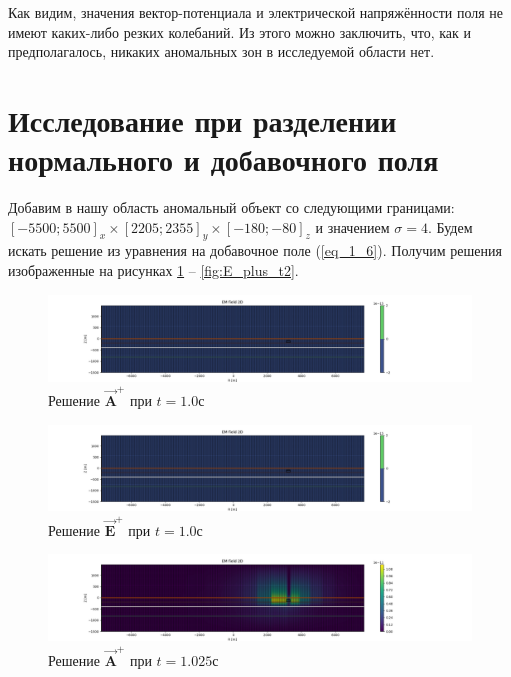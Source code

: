 Как видим, значения вектор-потенциала и электрической напряжённости поля не имеют каких-либо резких колебаний. Из этого можно заключить, что, как и предполагалось, никаких аномальных зон в исследуемой области нет. 

\section{Исследование при разделении нормального и добавочного поля}

Добавим в нашу область аномальный объект со следующими границами: $[-5500; 5500]_x \times [2205; 2355]_y \times [-180; -80]_z$ и значением $\sigma = 4$. Будем искать решение из уравнения на добавочное поле (\ref{eq_1_6}). Получим решения изображенные на рисунках \ref{fig:A_plus_t0} -- \ref{fig:E_plus_t2}.

\begin{figure}
	\centering
	\includegraphics[width=1.0\linewidth]{images/Answer_A_plus_time_layer_1.png}
	\caption{Решение $\overrightarrow{\textbf{A}}^+$ при $t = 1.0с$}
	\label{fig:A_plus_t0}
\end{figure} 


\begin{figure}
	\centering
	\includegraphics[width=1.0\linewidth]{images/Answer_E_plus_time_layer_1.png}
	\caption{Решение $\overrightarrow{\textbf{E}}^+$ при $t = 1.0с$}
	\label{fig:E_plus_t0}
\end{figure} 


\begin{figure}
	\centering
	\includegraphics[width=1.0\linewidth]{images/Answer_A_plus_time_layer_1.0250000000000006.png}
	\caption{Решение $\overrightarrow{\textbf{A}}^+$ при $t = 1.025с$}
	\label{fig:A_plus_t1}
\end{figure} 


